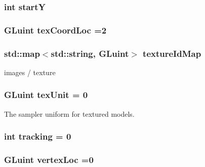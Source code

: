 \hypertarget{model_8cu_a7fd8d76428f3da6360d3219bb2b9673a}{
\subsubsection[{start\-Y}]{\setlength{\rightskip}{0pt plus 5cm}int start\-Y}}\label{model_8cu_a7fd8d76428f3da6360d3219bb2b9673a}
\hypertarget{model_8cu_a1a017d1373ae220b4ec413d55eebf11c}{
\subsubsection[{tex\-Coord\-Loc}]{\setlength{\rightskip}{0pt plus 5cm}G\-Luint tex\-Coord\-Loc =2}}\label{model_8cu_a1a017d1373ae220b4ec413d55eebf11c}
\hypertarget{model_8cu_a531fe6af3b950c3a770ea91117a9b24f}{
\subsubsection[{texture\-Id\-Map}]{\setlength{\rightskip}{0pt plus 5cm}std\-::map$<$std\-::string, G\-Luint$>$ texture\-Id\-Map}}\label{model_8cu_a531fe6af3b950c3a770ea91117a9b24f}


images / texture 

\hypertarget{model_8cu_a97e30e3db0b913943abcd0dc575ace53}{
\subsubsection[{tex\-Unit}]{\setlength{\rightskip}{0pt plus 5cm}G\-Luint tex\-Unit = 0}}\label{model_8cu_a97e30e3db0b913943abcd0dc575ace53}


The sampler uniform for textured models. 

\hypertarget{model_8cu_af140661d5ce1ea88b9a8b74bca0a2b6e}{
\subsubsection[{tracking}]{\setlength{\rightskip}{0pt plus 5cm}int tracking = 0}}\label{model_8cu_af140661d5ce1ea88b9a8b74bca0a2b6e}
\hypertarget{model_8cu_a5711328d3ae0b85040c6b5ab7a068938}{
\subsubsection[{vertex\-Loc}]{\setlength{\rightskip}{0pt plus 5cm}G\-Luint vertex\-Loc =0}}\label{model_8cu_a5711328d3ae0b85040c6b5ab7a068938}


